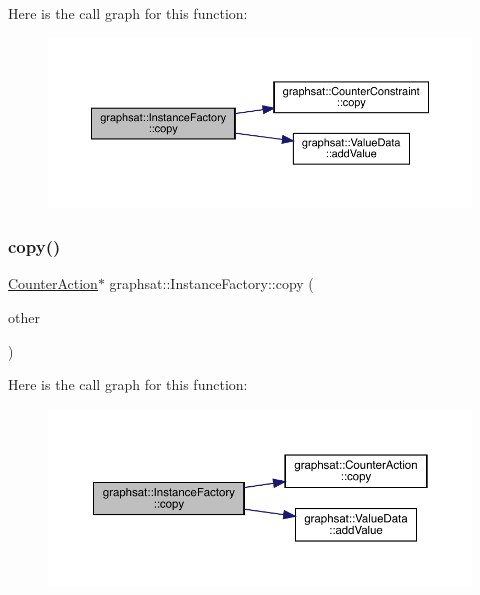 Here is the call graph for this function\+:
\nopagebreak
\begin{figure}[H]
\begin{center}
\leavevmode
\includegraphics[width=350pt]{classgraphsat_1_1_instance_factory_a309e53f4685517176eed7649eda1e9e7_cgraph}
\end{center}
\end{figure}
\mbox{\label{classgraphsat_1_1_instance_factory_ae9785cba22bec8be6e89dcc1bd207bd9}} 
\subsubsection{\texorpdfstring{copy()}{copy()}\hspace{0.1cm}{\footnotesize\ttfamily [2/2]}}
{\footnotesize\ttfamily \mbox{\hyperlink{classgraphsat_1_1_counter_action}{Counter\+Action}}$\ast$ graphsat\+::\+Instance\+Factory\+::copy (\begin{DoxyParamCaption}\item[{const \mbox{\hyperlink{classgraphsat_1_1_counter_action}{Counter\+Action}} $\ast$}]{other }\end{DoxyParamCaption})\hspace{0.3cm}{\ttfamily [inline]}}

Here is the call graph for this function\+:
\nopagebreak
\begin{figure}[H]
\begin{center}
\leavevmode
\includegraphics[width=350pt]{classgraphsat_1_1_instance_factory_ae9785cba22bec8be6e89dcc1bd207bd9_cgraph}
\end{center}
\end{figure}
\mbox{\label{classgraphsat_1_1_instance_factory_aa74280c3c94e38d1b092925172181276}} 
